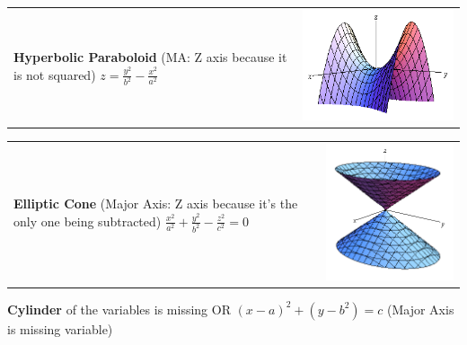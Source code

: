 \documentclass[8pt,landscape]{article}
\begin{document}
\begin{multicols*}{5}
\begin{tabularx}{\linewidth}{@{}X@{}X@{}}
    \textbf{Hyperbolic Paraboloid}\newline
    (MA: Z axis because it is not squared)\newline
    $ z=\frac{y^2}{b^2}-\frac{x^2}{a^2} $
    & \includegraphics[scale=0.15]{hyperbolic_paraboloid}
\end{tabularx}

\begin{tabularx}{\linewidth}{@{}X@{}X@{}}
    \textbf{Elliptic Cone}\newline
    (Major Axis: Z axis because it's the only one being subtracted)\newline
    $ \frac{x^2}{a^2}+\frac{y^2}{b^2}-\frac{z^2}{c^2} = 0 $
    & \includegraphics[scale=0.15]{elliptic_cone}
\end{tabularx}

\textbf{Cylinder} of the variables is missing\newline
OR 
$ (x-a)^2+(y-b^2) = c $\newline
(Major Axis is missing variable)


\end{multicols*}
\end{document}

